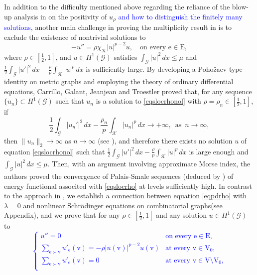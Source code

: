 \documentclass[11pt]{amsart}
\newcommand{\abs}[1]{\lvert#1\rvert}
\newcommand{\norm}[1]{\lVert#1\rVert}
\newcommand{\blue}[1]{\textcolor{blue}{#1}}
\newcommand{\G}{\mathcal{G}}
\newcommand{\K}{\mathcal{K}}
\newcommand{\E}{\mathrm{E}}
\newcommand{\V}{\mathrm{V}}
\newcommand{\e}{\mathrm{e}}
\newcommand{\vv}{\mathrm{v}}
\numberwithin{equation}{section}
\begin{document}
\iffalse
In addition to the difficulty mentioned above regarding the reliance of the blow-up analysis in \cite{Cha} on the positivity of $u_\rho$ \blue{and how to distinguish the finitely many solutions}, another main challenge in proving the multiplicity result in \cite{Ca} is to exclude the existence of nontrivial solutions to
\begin{equation}
\label{eqslocrhonol}
    -u'' = \rho\chi_\K\abs{u}^{p-2}u, \quad \text{on every } \e \in \E, 
\end{equation}
where $\rho \in [\frac{1}{2},1]$, and $u \in H^1(\G)$ satisfies $\int_{\G} \abs{u}^2\,dx \leq \mu$ and $\frac{1}{2}\int_{\G} \abs{u'}^2\,dx-\frac{\rho}{p}\int_{\K} \abs{u}^p\,dx$ is sufficiently large. By developing a Poho\v{z}aev type identity on metric graphs and employing the theory of ordinary differential equations, Carrillo, Galant, Jeanjean and Troestler \cite{Ca} proved that, for any sequence $\{u_n\} \subset H^1(\G)$ such that $u_n$ is a solution to \eqref{eqslocrhonol} with $\rho=\rho_n\in [\frac{1}{2},1]$, if 
$$\frac{1}{2}\int_{\G} \abs{u_n'}^2\,dx-\frac{\rho_n}{p}\int_{\K} \abs{u_n}^p\,dx \to +\infty,\,\,\,\text{as}\,\,\, n \to \infty,$$
then $\norm{u_n}_2 \to \infty$ as $n \to \infty$ (see \cite[Theorem 3.6]{Bort0}), and therefore there exists no solution $u$ of equation \eqref{eqslocrhonol} such that $\frac{1}{2}\int_{\G} \abs{u'}^2\,dx-\frac{\rho}{p}\int_{\K} \abs{u}^p\,dx$ is large enough and $\int_{\G} \abs{u}^2\,dx \leq \mu$.  Then, with an argument involving approximate Morse index, the authors proved the convergence of Palais-Smale sequences (deduced by \cite[Theorem 1.12]{Bort0}) of energy functional associted with \eqref{eqslocrho} at levels sufficiently high. In contrast to the approach in \cite{Ca},  we establish a connection between equation \eqref{eqpdrho} with $\lambda=0$ and nonlinear Schr\"odinger equations on combinatorial graphs(see Appendix), and we prove that for any $\rho \in [\frac{1}{2},1]$ and any solution $u\in H^1(\G)$ to 
\blue{
\begin{equation}\label{eqpdrhonol}
       \begin{cases} 
u'' = 0 & \text{on every }\e \in \E, \\ 
\displaystyle\sum_{\e \succ \vv} u'_\e(\vv) = -\rho|u(\vv)|^{p-2}u(\vv) & \text{at every } \vv \in \V_0,\\
\displaystyle\sum_{\e \succ \vv} u'_\e(\vv) =0 & \text{at every } \vv \in \V \setminus \V_0,\\
\end{cases} 
\end{equation}
}
\end{document}
